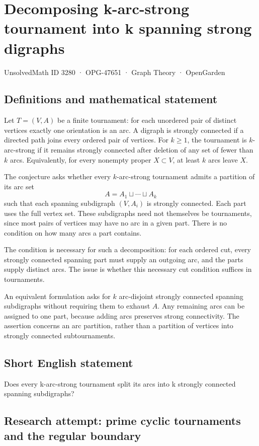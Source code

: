\documentclass[11pt,a4paper]{article}
\begin{document}
\section*{Decomposing k-arc-strong tournament into k spanning strong digraphs}\label{3280}
{\small UnsolvedMath ID 3280 · OPG-47651 · Graph Theory · OpenGarden}
\subsection{Definitions and mathematical statement}
Let $T=(V,A)$ be a finite tournament: for each unordered pair of distinct
vertices exactly one orientation is an arc. A digraph is strongly
connected if a directed path joins every ordered pair of vertices.
For $k\ge1$, the tournament is $k$-arc-strong if it remains strongly
connected after deletion of any set of fewer than $k$ arcs. Equivalently,
for every nonempty proper $X\subset V$, at least $k$ arcs leave $X$.

The conjecture asks whether every $k$-arc-strong tournament admits a
partition of its arc set
\[
                      A=A_1\sqcup\cdots\sqcup A_k
\]
such that each spanning subdigraph $(V,A_i)$ is strongly connected.
Each part uses the full vertex set. These subdigraphs need not themselves
be tournaments, since most pairs of vertices may have no arc in a
given part. There is no condition on how many arcs a part contains.

The condition is necessary for such a decomposition: for each ordered
cut, every strongly connected spanning part must supply an outgoing
arc, and the parts supply distinct arcs. The issue is whether this
necessary cut condition suffices in tournaments.

An equivalent formulation asks for $k$ arc-disjoint strongly connected
spanning subdigraphs without requiring them to exhaust $A$. Any remaining
arcs can be assigned to one part, because adding arcs preserves strong
connectivity. The assertion concerns an arc partition, rather than a
partition of vertices into strongly connected subtournaments.
\subsection{Short English statement}
Does every k-arc-strong tournament split its arcs into k strongly connected spanning subdigraphs?
\subsection{Research attempt: prime cyclic tournaments and the regular boundary}
\end{document}
